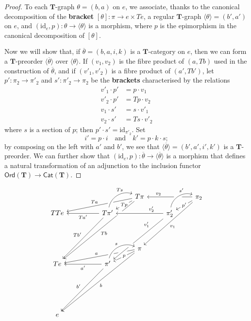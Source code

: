 \documentclass[fleqn]{article}
\newcommand{\oldpage}[1]{\marginpar{\footnotesize$\Big\vert$ \textit{p.~#1}}}
\newcommand{\unsure}[1]{{\color{purple}\textbf{#1}}}
\newcommand{\id}{\mathrm{id}}
\newcommand{\TT}{\mathbf{T}}
\newcommand{\textand}{\quad\text{and}\quad}
\newcommand{\Cat}[1]{\mathsf{#1}}
\newcommand{\Ord}[1]{\Cat{Ord}(#1)}
\begin{document}
\begin{proof}
  To each $\TT$-graph $\theta=(b,a)$ on $e$, we associate, thanks to the canonical decomposition of the \unsure{bracket} $[\theta]\colon\pi\to e\times Te$, a regular $\TT$-graph $\langle\theta\rangle=(b',a')$ on $e$, and $(\id_e,p)\colon\theta\to\langle\theta\rangle$ is a morphism, where $p$ is the epimorphism in the canonical decomposition of $[\theta]$.

  Now we will show that, if $\overline{\theta}=(b,a,i,k)$ is a $\TT$-category on $e$, then we can form a $\TT$-preorder $\langle\overline{\theta}\rangle$ over $\langle\theta\rangle$.
  If $(v_1,v_2)$ is the fibre product of $(a,Tb)$ used in the construction of $\overline{\theta}$, and if $(v'_1,v'_2)$ is a fibre product of $(a',Tb')$, let $p'\colon\pi_2\to\pi'_2$ and $s'\colon\pi'_2\to\pi_2$ be the \unsure{brackets} characterised by the relations
  \[
    \begin{aligned}
      v'_1\cdot p'
    & = p\cdot v_1
    \\v'_2\cdot p'
    & = Tp\cdot v_2
    \\v_1\cdot s'
    & = s\cdot v'_1
    \\v_2\cdot s'
    & = Ts\cdot v'_2
    \end{aligned}
  \]
  where $s$ is a section of $p$;
  then $p'\cdot s'=\id_{\pi'_2}$.
  Set
  \[
    i' = p\cdot i
    \textand
    k' = p\cdot k\cdot s;
  \]
  by composing on the left with $a'$ and $b'$, we see that $\langle\overline{\theta}\rangle=(b',a',i',k')$ is a $\TT$-preorder.
  \oldpage{240}
  We can further show that $(\id_e,p)\colon\overline{\theta}\to\langle\overline{\theta}\rangle$ is a morphism that defines a natural transformation of an adjunction to the inclusion functor $\Ord{\TT}\to\Cat{Cat}(\TT)$.
\end{proof}

\[
  \begin{tikzcd}
  &&&T\pi
      \ar[dlll,swap,"Ta"]
      \ar[dl,"Tp"description]
      \ar[dddlll,"Tb"]
  &&\pi_2
      \ar[ll,near end,swap,"v_2"]
      \ar[dl,"p'"description]
      \ar[ddll,"v_1"]
  \\[-1em]TTe
  && T\pi'
      \ar[ur,bend left=50,near end,"Ts",crossing over]
      \ar[ll,"Ta'"]
      \ar[ddll,swap,"Tb'"]
  &&\pi'_2
      \ar[ur,bend left=50,near end,"s'",crossing over]
      \ar[ll,near start,swap,"v'_2",crossing over]
  \\[2em]
  &&&\pi
      \ar[dlll,swap,"a"]
      \ar[dl,"p"description]
      \ar[dddlll,"b"]
  \\[-1em]Te
  && \pi'
      \ar[from=2-5,near start,swap,"v'_1",crossing over]
      \ar[ll,"a'"]
      \ar[ddll,swap,"b'"]
      \ar[ur,bend left=50,"s",crossing over]
  \\{}
  \\[2em]e
  \end{tikzcd}
\]
\end{document}
